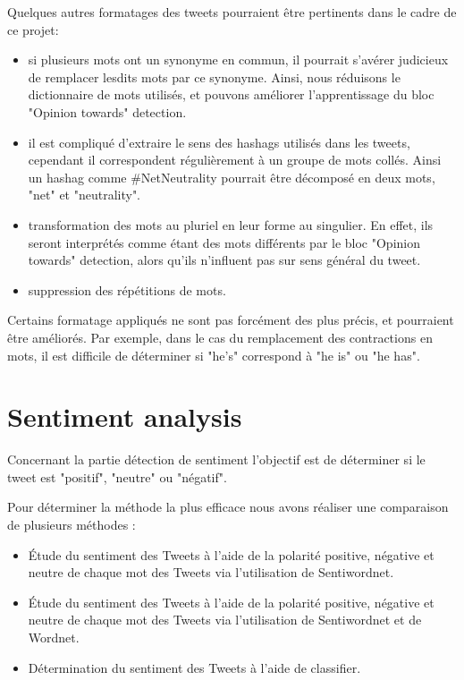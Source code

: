 \par Quelques autres formatages des tweets pourraient être pertinents dans le cadre de ce projet: \\
\begin{itemize}
  \item si plusieurs mots ont un synonyme en commun, il pourrait s'avérer judicieux de remplacer lesdits mots par ce synonyme. Ainsi, nous réduisons le dictionnaire de mots utilisés, et pouvons améliorer l'apprentissage du bloc "Opinion towards" detection.
  \item il est compliqué d'extraire le sens des hashags utilisés dans les tweets, cependant il correspondent régulièrement à un groupe de mots collés. Ainsi un hashag comme \#NetNeutrality pourrait être décomposé en deux mots, "net" et "neutrality".
  \item transformation des mots au pluriel en leur forme au singulier. En effet, ils seront interprétés comme étant des mots différents par le bloc "Opinion towards" detection, alors qu'ils n'influent pas sur sens général du tweet.
  \item suppression des répétitions de mots.
\end{itemize}
Certains formatage appliqués ne sont pas forcément des plus précis, et pourraient être améliorés. Par exemple, dans le cas du remplacement des contractions en mots, il est difficile de déterminer si "he's" correspond à "he is" ou "he has".

\section{Sentiment analysis}

\par Concernant la partie détection de sentiment l'objectif est de déterminer si le tweet est "positif", "neutre" ou "négatif". 
\par Pour déterminer la méthode la plus efficace nous avons réaliser une comparaison de plusieurs méthodes :\\

\begin{itemize}
	\item Étude du sentiment des Tweets à l'aide de la polarité positive, négative et neutre de chaque mot des Tweets via l'utilisation de Sentiwordnet.
	\item Étude du sentiment des Tweets à l'aide de la polarité positive, négative et neutre de chaque mot des Tweets via l'utilisation de Sentiwordnet et de Wordnet.
	\item Détermination du sentiment des Tweets à l'aide de classifier.
\end{itemize}

